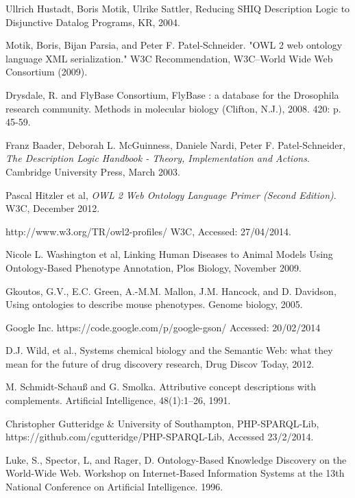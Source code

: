 \documentclass{article}
\begin{document}
\begin{thebibliography}{9}
  Ullrich Hustadt, Boris Motik, Ulrike Sattler,
  Reducing SHIQ Description Logic to Disjunctive Datalog Programs,
  KR,
  2004.

  Motik, Boris, Bijan Parsia, and Peter F. Patel-Schneider. "OWL 2 web ontology
  language XML serialization." W3C Recommendation, W3C–World Wide Web Consortium
  (2009).

  Drysdale, R. and FlyBase Consortium, FlyBase : a database for the Drosophila research community.
  Methods in molecular biology (Clifton, N.J.), 2008. 420: p. 45-59.

 Franz Baader, Deborah L. McGuinness, Daniele Nardi, Peter F. Patel-Schneider,
 \emph{The Description Logic Handbook - Theory, Implementation and Actions}.
 Cambridge University Press,
 March 2003.

  Pascal Hitzler et al,
  \emph{OWL 2 Web Ontology Language Primer (Second Edition)}.
  W3C,
  December 2012.

  http://www.w3.org/TR/owl2-profiles/
  W3C,
  Accessed: 27/04/2014.

  Nicole L. Washington et al,
  Linking Human Diseases to Animal Models Using Ontology-Based Phenotype Annotation,
  Plos Biology,
  November 2009.

  Gkoutos, G.V., E.C. Green, A.-M.M. Mallon, J.M. Hancock, and D. Davidson,
  Using ontologies to describe mouse phenotypes. 
  Genome biology, 
  2005.

  Google Inc.
  https://code.google.com/p/google-gson/
  Accessed: 20/02/2014

  D.J. Wild, et al.,
  Systems chemical biology and the Semantic Web: what they mean for the future of drug discovery research,
  Drug Discov Today,
  2012.

  M. Schmidt-Schauß and G. Smolka. 
  Attributive concept descriptions with complements.
  Artificial Intelligence, 48(1):1–26, 1991.

  Christopher Gutteridge & University of Southampton,
  PHP-SPARQL-Lib,
  https://github.com/cgutteridge/PHP-SPARQL-Lib,
  Accessed 23/2/2014.

  Luke, S., Spector, L, and Rager, D. 
  Ontology-Based Knowledge Discovery on the World-Wide Web. 
  Workshop on Internet-Based Information Systems at the 13th National Conference on Artificial Intelligence. 
  1996.


\end{thebibliography}
\end{document}
